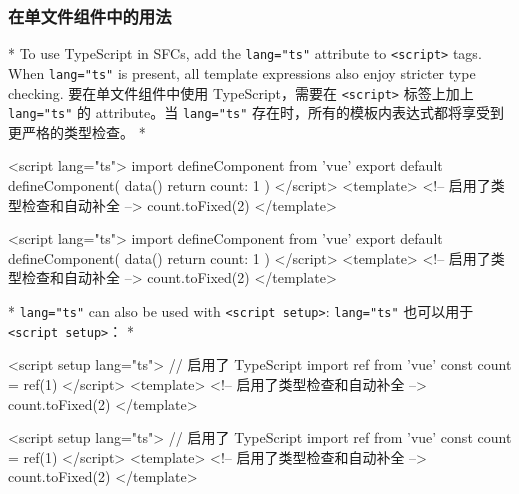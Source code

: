 \begin{paracol}{2}
\subsubsection{在单文件组件中的用法}
\switchcolumn[0]*%
To use TypeScript in SFCs, add the \texttt{lang="ts"} attribute to
\texttt{\textless{}script\textgreater{}} tags. When \texttt{lang="ts"}
is present, all template expressions also enjoy stricter type checking.
\switchcolumn
要在单文件组件中使用 TypeScript，需要在
\texttt{\textless{}script\textgreater{}} 标签上加上 \texttt{lang="ts"}
的 attribute。当 \texttt{lang="ts"}
存在时，所有的模板内表达式都将享受到更严格的类型检查。
\switchcolumn[0]*%
\begin{codeHtml}
<script lang="ts">
import { defineComponent } from 'vue'
export default defineComponent({
  data() {
    return {
      count: 1
    }
  }
})
</script>
<template>
  <!-- 启用了类型检查和自动补全 -->
  {{ count.toFixed(2) }}
</template>
\end{codeHtml}
\switchcolumn
\begin{codeHtml}
<script lang="ts">
import { defineComponent } from 'vue'
export default defineComponent({
  data() {
    return {
      count: 1
    }
  }
})
</script>
<template>
  <!-- 启用了类型检查和自动补全 -->
  {{ count.toFixed(2) }}
</template>
\end{codeHtml}
\switchcolumn[0]*%
\texttt{lang="ts"} can also be used with
\texttt{\textless{}script\ setup\textgreater{}}:
\switchcolumn
\texttt{lang="ts"} 也可以用于
\texttt{\textless{}script\ setup\textgreater{}}：
\switchcolumn[0]*%
\begin{codeHtml}
<script setup lang="ts">
// 启用了 TypeScript
import { ref } from 'vue'
const count = ref(1)
</script>
<template>
  <!-- 启用了类型检查和自动补全 -->
  {{ count.toFixed(2) }}
</template>
\end{codeHtml}
\switchcolumn
\begin{codeHtml}
<script setup lang="ts">
// 启用了 TypeScript
import { ref } from 'vue'
const count = ref(1)
</script>
<template>
  <!-- 启用了类型检查和自动补全 -->
  {{ count.toFixed(2) }}
</template>
\end{codeHtml}
\end{paracol}


